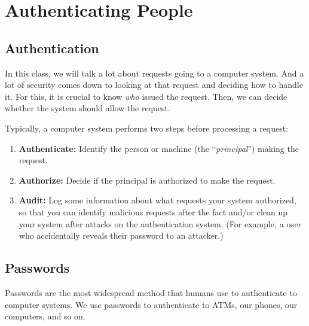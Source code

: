 \chapter{Authenticating People}


\section{Authentication}
In this class, we will talk a lot about requests
going to a computer system.
And a lot of security comes down to looking at that request and deciding
how to handle it.
For this, it is crucial to know
\textit{who} issued the request. Then, we can
decide whether the system should allow the request. 

Typically, a computer system performs two steps before processing
a request:
\begin{enumerate}
  \item \textbf{Authenticate:} Identify the person 
          or machine (the ``\emph{principal}'') making the request.
  \item \textbf{Authorize:} Decide if the principal 
          is authorized to make the request.
  \item \textbf{Audit:} Log some information about what
          requests your system authorized, so that you can 
          identify malicious requests after the fact and/or
          clean up your system after attacks on the authentication
          system. (For example, a user who accidentally reveals
          their password to an attacker.)

\end{enumerate}

\section{Passwords}
Passwords are the most widespread method 
that humans use to authenticate to computer systems.
We use passwords to authenticate to ATMs,
our phones, our computers, and so on.

